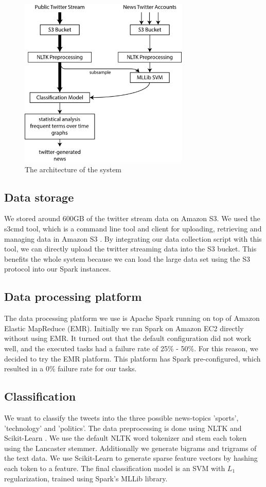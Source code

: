 \documentclass{llncs}
\begin{document}
\begin{figure}[H]
	\centering
	\includegraphics[width=0.72\textwidth]{images/system_arch.png} 
	\caption{The architecture of the system}
	\label{fig:architecture}
\end{figure}

\subsection{Data storage}
We stored around 600GB of the twitter stream data on Amazon S3. We used the s3cmd tool, which is a command line tool and client for uploading, retrieving and managing data in Amazon S3 \cite{s3cmd}. By integrating our data collection script with this tool, we can directly upload the twitter streaming data into the S3 bucket. This benefits the whole system because we can load the large data set using the S3 protocol into our Spark instances.

\subsection{Data processing platform}
The data processing platform we use is Apache Spark running on top of Amazon Elastic MapReduce (EMR). Initially we ran Spark on Amazon EC2 directly without using EMR. It turned out that the default configuration did not work well, and the executed tasks had a failure rate of 25\% - 50\%. For this reason, we decided to try the EMR platform. This platform has Spark pre-configured, which resulted in a 0\% failure rate for our tasks.

\subsection{Classification}
We want to classify the tweets into the three possible news-topics 'sports', 'technology' and 'politics'. The data preprocessing is done using NLTK \cite{nltk} and Scikit-Learn \cite{scikit-learn}. We use the default NLTK word tokenizer and stem each token using the Lancaster stemmer. Additionally we generate bigrams and trigrams of the text data. We use Scikit-Learn to generate sparse feature vectors by hashing each token to a feature. The final classification model is an SVM with $L_1$ regularization, trained using Spark's MLLib library\cite{mllib}.
\end{document}
